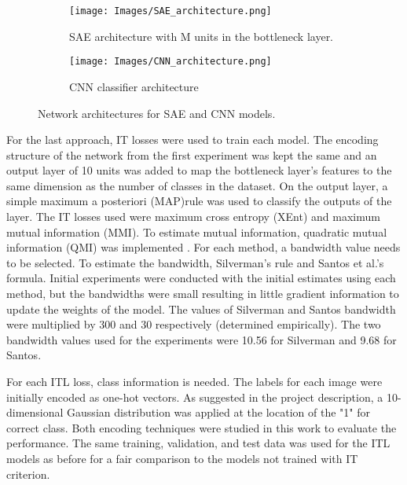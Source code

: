 \documentclass[conference]{IEEEtran}
\begin{document}
\begin{figure*}[t]
	\centering
	\begin{subfigure}{.80\textwidth}{
			\texttt{[image: Images/SAE\_architecture.png]}
			\caption{SAE architecture with M units in the bottleneck layer.}
			\label{fig:SAE}
		}
	\end{subfigure}


	\begin{subfigure}{.80\textwidth}{
			\texttt{[image: Images/CNN\_architecture.png]}
			\caption{CNN classifier architecture}
			\label{fig:CNN}
		}
	\end{subfigure}
	
	\caption{Network architectures for SAE and CNN models.}
	\centering
	\label{fig:CM}
\end{figure*}
 
	For the last approach, IT losses were used to train each model. The encoding structure of the network from the first experiment was kept the same and an output layer of 10 units was added to map the bottleneck layer's features to the same dimension as the number of classes in the dataset. On the output layer, a simple maximum a posteriori (MAP)rule was used to classify the outputs of the layer. The IT losses used were maximum cross entropy (XEnt) and maximum mutual information (MMI). To estimate mutual information, quadratic mutual information (QMI) was implemented \cite{principe2010information}. For each method, a bandwidth value needs to be selected. To estimate the bandwidth, Silverman's rule \cite{silverman1986density} and Santos et al.'s formula\cite{santos2004error}. Initial experiments were conducted with the initial estimates using each method, but the bandwidths were small resulting in little gradient information to update the weights of the model. The values of Silverman and Santos bandwidth were multiplied by 300 and 30 respectively (determined empirically). The two bandwidth values used for the experiments were 10.56 for Silverman and 9.68 for Santos.

	For each ITL loss, class information is needed. The labels for each image were initially encoded as one-hot vectors. As suggested in the project description, a 10-dimensional Gaussian distribution was applied at the location of the "1" for correct class. Both encoding techniques were studied in this work to evaluate the performance. The same training, validation, and test data was used for the ITL models as before for a fair comparison to the models not trained with IT criterion.
	  
\end{document}
